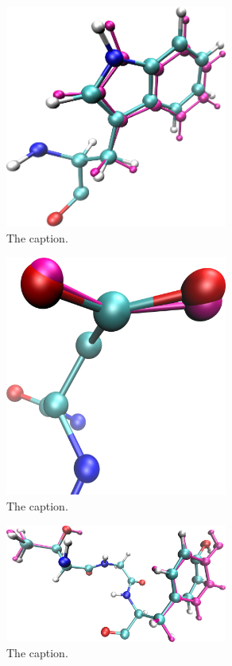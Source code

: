 \begin{figure}[h]
  \centering
  \includegraphics[width=0.65\textwidth]{figures/mutation_side_chain_images/1fcc_43.png}
  \caption{The caption.}
  \label{figure:computational_mutation_scanning/figname}
\end{figure}


\begin{figure}[h]
  \centering
  \includegraphics[width=0.65\textwidth]{figures/mutation_side_chain_images/1brs_chain_d_35.png}
  \caption{The caption.}
  \label{figure:computational_mutation_scanning/figname}
\end{figure}

\begin{figure}[h]
  \centering
  \includegraphics[width=0.65\textwidth]{figures/mutation_side_chain_images/1dvf_chain_b_30_and_32.png}
  \caption{The caption.}
  \label{figure:computational_mutation_scanning/figname}
\end{figure}


